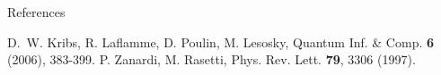 
\begin{block}{References}
\vskip1cm
\small{\begin{thebibliography}{99}
 D.~W. Kribs, R. Laflamme, D. Poulin, M. Lesosky, Quantum Inf. \& Comp. \textbf{6} (2006), 383-399.
 P. Zanardi, M. Rasetti, Phys. Rev. Lett. \textbf{79},  3306 (1997).
\end{thebibliography}}
\vspace{0.75in}
\end{block}